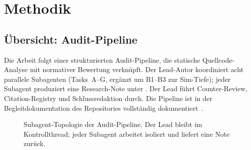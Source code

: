\chapter{Methodik}\label{ch:methodik}

\section{Übersicht: Audit-Pipeline}\label{sec:audit-pipeline}

Die Arbeit folgt einer strukturierten Audit-Pipeline, die statische Quellcode-Analyse mit normativer Bewertung verknüpft. Der Lead-Autor koordiniert acht parallele Subagenten (Tasks~A–G, ergänzt um B1–B3 zur Sim-Tiefe); jeder Subagent produziert eine Research-Note unter . Der Lead führt Counter-Review, Citation-Registry und Schlussredaktion durch. Die Pipeline ist in der Begleitdokumentation des Repositories vollständig dokumentiert~\cite{zenodo-agora}.

\begin{figure}[ht]
  \centering
  \caption{Subagent-Topologie der Audit-Pipeline. Der Lead bleibt im Kontrollthread; jeder Subagent arbeitet isoliert und liefert eine Note zurück.}
  \label{fig:audit-pipeline}
\end{figure}

